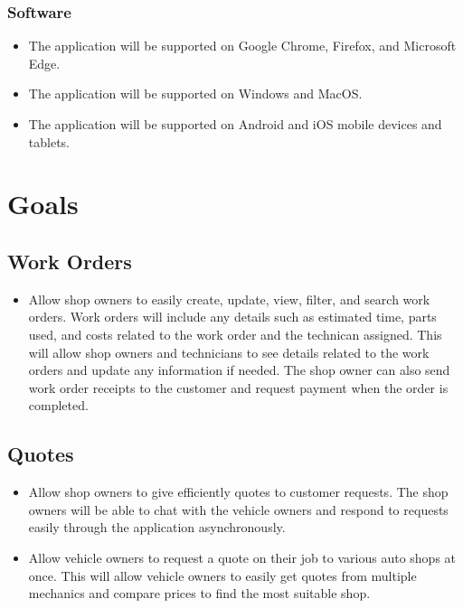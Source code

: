 \documentclass{article}
\begin{document}
\subsubsection{Software}
\begin{itemize}
    \item The application will be supported on Google Chrome, Firefox, and Microsoft Edge.
    \item The application will be supported on Windows and MacOS.
    \item The application will be supported on Android and iOS mobile devices and tablets.
\end{itemize}

\section{Goals}
\subsection{Work Orders}
\begin{itemize}
\item Allow shop owners to easily create, update, view, filter, and search work orders. Work orders will include any details such as estimated time, parts used, and costs related to the work order and the technican assigned. This will allow shop owners and technicians to see details related to the work orders and update any information if needed. The shop owner can also send work order receipts to the customer and request payment when the order is completed.
\end{itemize}

\subsection{Quotes}
\begin{itemize}
\item Allow shop owners to give efficiently quotes to customer requests. The shop owners will be able to chat with the vehicle owners and respond to requests easily through the application asynchronously.
\item Allow vehicle owners to request a quote on their job to various auto shops at once. This will allow vehicle owners to easily get quotes from multiple mechanics and compare prices to find the most suitable shop.
\end{itemize}
\end{document}
